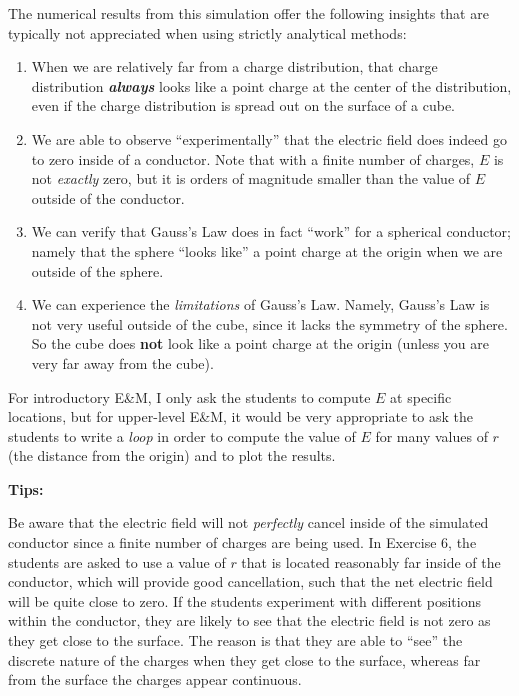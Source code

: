 \documentclass[]{article}
\providecommand{\tightlist}{%
  \setlength{\itemsep}{0pt}\setlength{\parskip}{0pt}}
\begin{document}
The numerical results from this simulation offer the following insights
that are typically not appreciated when using strictly analytical
methods:

\begin{enumerate}
\def\labelenumi{\arabic{enumi}.}
\tightlist
\item
  When we are relatively far from a charge distribution, that charge
  distribution \textbf{\emph{always}} looks like a point charge at the
  center of the distribution, even if the charge distribution is spread
  out on the surface of a cube.
\item
  We are able to observe ``experimentally'' that the electric field does
  indeed go to zero inside of a conductor. Note that with a finite
  number of charges, \(E\) is not \emph{exactly} zero, but it is orders
  of magnitude smaller than the value of \(E\) outside of the conductor.
\item
  We can verify that Gauss's Law does in fact ``work'' for a spherical
  conductor; namely that the sphere ``looks like'' a point charge at the
  origin when we are outside of the sphere.
\item
  We can experience the \emph{limitations} of Gauss's Law. Namely,
  Gauss's Law is not very useful outside of the cube, since it lacks the
  symmetry of the sphere. So the cube does \textbf{not} look like a
  point charge at the origin (unless you are very far away from the
  cube).
\end{enumerate}

For introductory E\&M, I only ask the students to compute \(E\) at
specific locations, but for upper-level E\&M, it would be very
appropriate to ask the students to write a \emph{loop} in order to
compute the value of \(E\) for many values of \(r\) (the distance from
the origin) and to plot the results.

\textbf{Tips:}

Be aware that the electric field will not \emph{perfectly} cancel inside
of the simulated conductor since a finite number of charges are being
used. In Exercise 6, the students are asked to use a value of \(r\) that
is located reasonably far inside of the conductor, which will provide
good cancellation, such that the net electric field will be quite close
to zero. If the students experiment with different positions within the
conductor, they are likely to see that the electric field is not zero as
they get close to the surface. The reason is that they are able to
``see'' the discrete nature of the charges when they get close to the
surface, whereas far from the surface the charges appear continuous.
\end{document}
